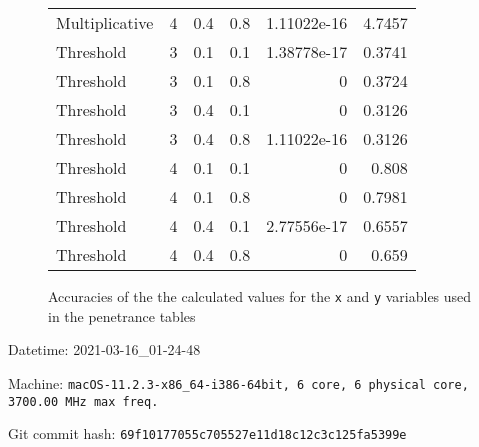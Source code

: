 \documentclass{article}
\begin{document}
\begin{figure}[H]
\begin{tabular}{lrrrrr}
 Multiplicative &       4 &   0.4 &            0.8 & 1.11022e-16 &            4.7457 \\
 Threshold      &       3 &   0.1 &            0.1 & 1.38778e-17 &            0.3741 \\
 Threshold      &       3 &   0.1 &            0.8 & 0           &            0.3724 \\
 Threshold      &       3 &   0.4 &            0.1 & 0           &            0.3126 \\
 Threshold      &       3 &   0.4 &            0.8 & 1.11022e-16 &            0.3126 \\
 Threshold      &       4 &   0.1 &            0.1 & 0           &            0.808  \\
 Threshold      &       4 &   0.1 &            0.8 & 0           &            0.7981 \\
 Threshold      &       4 &   0.4 &            0.1 & 2.77556e-17 &            0.6557 \\
 Threshold      &       4 &   0.4 &            0.8 & 0           &            0.659  \\
\hline
\end{tabular}
\caption{Accuracies of the the calculated values for the \texttt{x} and \texttt{y} variables used in the penetrance tables}
\end{figure}
Datetime: 2021-03-16\_01-24-48

Machine: \texttt{macOS-11.2.3-x86\_64-i386-64bit, 6 core, 6 physical core, 3700.00 MHz max freq.}

Git commit hash: \texttt{69f10177055c705527e11d18c12c3c125fa5399e}
\end{document}

